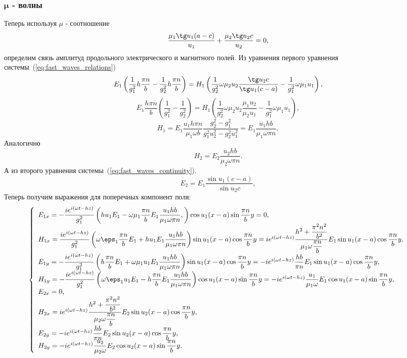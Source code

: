 \subsubsection{\(\boldsymbol{\mu}\) - волны}
Теперь используя \( \mu \) - соотношение
\[
    \frac{\mu_1\tg u_1 (a-c)}{u_1} + \frac{\mu_2\tg u_2 c}{u_2} = 0,
\]
определим связь амплитуд продольного электрического и магнитного полей.
Из уравнения первого уравнения системы~(\ref{eq:fast_waves_relations})
\[
    E_1\left(\frac{1}{g_1^2} h \frac{\pi n}{b}-
    \frac{1}{g_2^2}h \frac{\pi n}{b}\right) =
    H_1\left(\frac{1}{g_2^2}\omega\mu_2u_2\frac{\tg u_2 c}{\tg u_1 (c-a)}-
    \frac{1}{g_1^2}\omega\mu_1u_1\right),
\]
\[
    E_1\frac{h\pi n}{b}\left(\frac{1}{g_1^2}-\frac{1}{g_2^2}\right)=
    H_1\left(\frac{1}{g_2^2}\omega\mu_2u_2\frac{\mu_1u_2}{\mu_2u_1}-
    \frac{1}{g_1^2}\omega\mu_1u_1\right),
\]
\[
    H_1 = E_1\frac{u_1h\pi n}{\mu_1\omega b}
    \frac{g_2^2-g_1^2}{g_1^2u_2^2 - g_2^2u_1^2} =
    E_1\frac{u_1hb}{\mu_1\omega\pi n},
\]
Аналогично
\[
    H_2 = E_2\frac{u_2hb}{\mu_2\omega\pi n}.
\]
А из второго уравнения системы~(\ref{eq:fast_waves_continuity}).
\[
    E_2 = E_1\frac{\sin u_1(c-a)}{\sin u_2 c},
\]
Теперь получим выражения для поперечных компонент поля:
\[
    \left\{
    \begin{array}{l}
        E_{1x} = -\frac{i e^{i(\omega t - h z)}}{g_1^2}
        \left(h u_1 E_1 -
        \omega\mu_1\frac{\pi n}{b}E_1\frac{u_1hb}{\mu_1\omega\pi n},\right)
        \cos u_1 (x-a) \sin \frac{\pi n}{b}y = 0,\\
        H_{1x} = \frac{i e^{i(\omega t - h z)}}{g_1^2}
        \left(\omega\eps_1\frac{\pi n}{b}E_1+
        h u_1 E_1\frac{u_1hb}{\mu_1\omega\pi n}\right)
        \sin u_1 (x-a) \cos \frac{\pi n}{b}y =
        i e^{i(\omega t - h z)}\frac{h^2 + \frac{\pi^2 n^2}{b^2}}
        {\mu_1\omega\frac{\pi n}{b}}E_1\sin u_1 (x-a) \cos \frac{\pi n}{b}y,\\
        E_{1y} = -\frac{i e^{i(\omega t - h z)}}{g_1^2}
        \left(h \frac{\pi n}{b} E_1 +
        \omega\mu_1u_1E_1\frac{u_1hb}{\mu_1\omega\pi n}\right)
        \sin u_1 (x-a) \cos \frac{\pi n}{b}y = -i e^{i(\omega t - h z)}
        \frac{hb}{\pi n} E_1\sin u_1 (x-a) \cos \frac{\pi n}{b}y,\\
        H_{1y} = -\frac{i e^{i(\omega t - h z)}}{g_1^2}
        \left(\omega\eps_1u_1E_1-
        h \frac{\pi n}{b} E_1\frac{u_1hb}{\mu_1\omega\pi n}\right)
        \cos u_1 (x-a) \sin \frac{\pi n}{b}y = -i e^{i(\omega t - h z)}
        \frac{u_1}{\mu_1\omega}E_1\cos u_1 (x-a) \sin \frac{\pi n}{b}y,\\
        E_{2x} = 0,\\
        H_{2x} = i e^{i(\omega t - h z)} \frac{h^2 + \frac{\pi^2 n^2}{b^2}}
        {\mu_2\omega\frac{\pi n}{b}} E_2\sin u_2 (x-a) \cos \frac{\pi n}{b}y,\\
        E_{2y} = -i e^{i(\omega t - h z)}
        \frac{hb}{\pi n} E_2\sin u_2 (x-a) \cos \frac{\pi n}{b}y,\\
        H_{2y} = -i e^{i(\omega t - h z)}
        \frac{u_2}{\mu_2\omega}E_2\cos u_2 (x-a) \sin \frac{\pi n}{b}y.\\
    \end{array}
    \right.
\]

